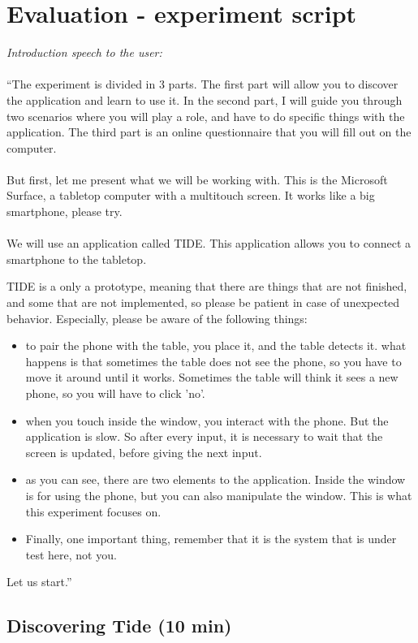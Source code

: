 \chapter{Evaluation - experiment script}
\label{app:evalscript}

\emph{Introduction speech to the user:}
\\\\
``The experiment is divided in 3 parts.
The first part will allow you to discover the application and learn to use it.
In the second part, I will guide you through two scenarios where you will play a role, and have to do specific things with the application.
The third part is an online questionnaire that you will fill out on the computer.
\\\\
But first, let me present what we will be working with.
This is the Microsoft Surface, a tabletop computer with a multitouch screen.
It works like a big smartphone, please try.
\\\\
We will use an application called TIDE.
This application allows you to connect a smartphone to the tabletop.

TIDE is a only a prototype, meaning that there are things that are not finished, and some that are not implemented, so please be patient in case of unexpected behavior.
Especially, please be aware of the following things:
\begin{itemize}
\item to pair the phone with the table, you place it, and the table detects it. what happens is that sometimes the table does not see the phone, so you have to move it around until it works. Sometimes the table will think it sees a new phone, so you will have to click 'no'.
\item when you touch inside the window, you interact with the phone. But the application is slow. So after every input, it is necessary to wait that the screen is updated, before giving the next input.
\item as you can see, there are two elements to the application. Inside the window is for using the phone, but you can also manipulate the window. This is what this experiment focuses on.
\item Finally, one important thing, remember that it is the system that is under test here, not you.
\end{itemize}
Let us start.''

\section{Discovering Tide (10 min)}

